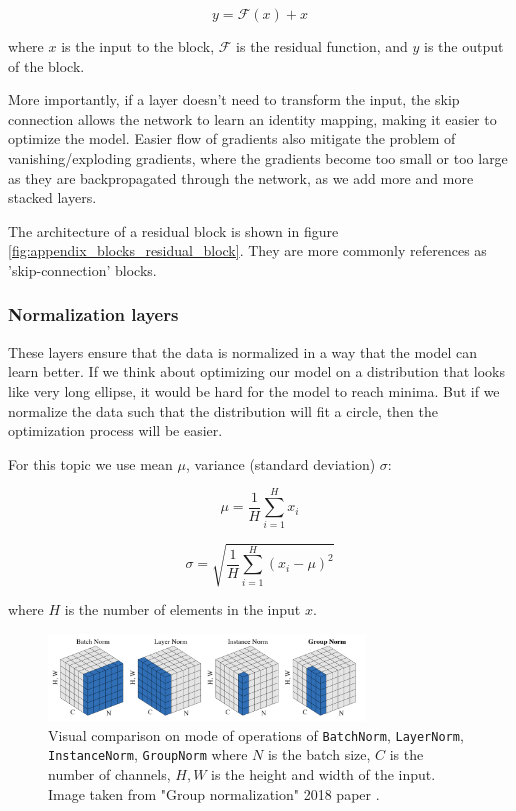 \begin{equation*}
    y = \mathcal{F} (x) + x
\end{equation*}

where $x$ is the input to the block, $\mathcal{F}$ is the residual function, and $y$ is the output of the block.

More importantly, if a layer doesn't need to transform the input, the skip connection allows the network to learn an identity mapping, making it easier to optimize the model. Easier flow of gradients also mitigate the problem of vanishing/exploding gradients, where the gradients become too small or too large as they are backpropagated through the network, as we add more and more stacked layers.

The architecture of a residual block is shown in figure \ref{fig:appendix_blocks_residual_block}. They are more commonly references as 'skip-connection' blocks.






\subsubsection{Normalization layers}
\label{appendix:blocks_norm}

These layers ensure that the data is normalized in a way that the model can learn better. If we think about optimizing our model on a distribution that looks like very long ellipse, it would be hard for the model to reach minima. But if we normalize the data such that the distribution will fit a circle, then the optimization process will be easier. 

For this topic we use mean $\mu$, variance (standard deviation) $\sigma$:

\[ \mu = \frac{1}{H} \sum_{i=1}^{H} x_i \]

\[ \sigma = \sqrt{\frac{1}{H} \sum_{i=1}^{H} (x_i - \mu)^2} \]

where $H$ is the number of elements in the input $x$.

\begin{figure}
    \centering
    \includegraphics[width=0.75\textwidth]{images/appendix/blocks/norm.png}
    \caption{Visual comparison on mode of operations of \texttt{BatchNorm}, \texttt{LayerNorm}, \texttt{InstanceNorm}, \texttt{GroupNorm} where $N$ is the batch size, $C$ is the number of channels, $H,W$ is the height and width of the input. Image taken from "Group normalization" 2018 paper \cite{wu2018group}.}
    \label{fig:appendix_blocks_norm}
\end{figure}

